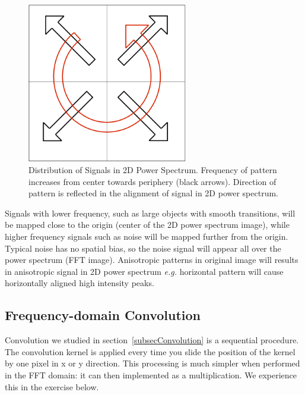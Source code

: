  \begin{figure}[H]
 \begin{center}
 \includegraphics[width=7cm]{fig/FFTscheme.png}
 \caption{ Distribution of Signals in 2D Power Spectrum. Frequency of pattern increases from center towards periphery (black arrows). Direction of pattern is reflected in the alignment of signal in 2D power spectrum.}
 \label{fig:imgFFT}
 \end{center}
 \end{figure}

Signals with lower frequency, such as large objects with smooth transitions, will be mapped close to
the origin (center of the 2D power spectrum image), while higher frequency signals
such as noise will be mapped further from the origin. Typical noise has no spatial bias, so the noise signal will appear all over the power spectrum (FFT image). 
Anisotropic patterns in original image will results in anisotropic signal in 2D power spectrum \textit{e.g.} horizontal pattern will cause horizontally aligned high intensity peaks. 

\subsection{Frequency-domain Convolution}

Convolution we studied in section~\ref{subsecConvolution} is a sequential
procedure. The convolution kernel is applied every time you slide the position of
the kernel by one pixel in x or y direction. This processing is much simpler when performed in the FFT domain: it can then implemented as a multiplication. We
experience this in the exercise below. 

